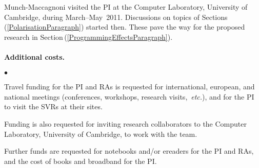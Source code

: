 \documentclass[11pt,twocolumn]{article}
\newenvironment{myitemize}
  {\begin{list}{$\bullet$}
  {\setlength{\topsep}{2pt}
   \setlength{\partopsep}{2pt}
   \setlength{\itemsep}{2.5pt}
   \setlength{\parsep}{2.5pt}
   \setlength{\leftmargin}{1em}
   \setlength{\labelwidth}{.5em}}}
  {\end{list}}
\newcommand{\hidefootnote}[2]{}
\newcommand{\pref}[1]{\,(\ref{#1})}
\newcommand{\Eg}{\emph{Eg.}}
\newcommand{\etc}{\emph{etc.}}
\begin{document}
Munch-Maccagnoni visited the PI at the Computer Laboratory, University of
Cambridge, during March--May~2011.  Discussions on topics of
Sections\pref{PolarisationParagraph} started then.  These pave the way for the
proposed research in Section\pref{ProgrammingEffectsParagraph}.



\paragraph*{Additional costs.}

\begin{myitemize}
\item
Travel funding for the PI and RAs is requested for international, european,
and national meetings (conferences, workshops, research
visits,~\etc),\hidefootnote{\Eg~CALCO, CIE, CSL, CT, ICALP, ICFP, LICS, MFPS,
  POPL, PPDP, PSSL, RTA, TLCA, TYPES, WOLLIC.}{} 
and for the PI to visit the SVRs at their sites. \hidefootnote{\Eg~Aarhus
  (A\,Kock); 
  Bamberg (Mendler);
  Barcelona (J\,Kock);
  Bath (Power); 
  Berkeley (D\,Scott); 
  Birmingham (Escard\'o, Levy); 
  Bologna (Asperti, Dal Lago);
  Buffalo (Lawvere);
  Copenhagen (Birkedal, Filinski); 
  Darmstadt (Streicher); 
  Dublin (Dotsenko);
  Edinburgh (Leinster, Plotkin, A\,Simpson); 
  Genova (Moggi, Rosolini); 
  G\"oteborg (Coquand, Dybjer);
  Gunma (Hamana);
  Ljubljana (Bauer, Pretnar);
  London (Oliva);
  Manchester (Aczel);
  Marseille (Girard, Lafont, Regnier); 
  Montreal (Joyal, Makkai, Panangaden);
  Munich (Abel, Hofmann);
  Nice (C\,Simpson, Vallette);
  Nijmegen (Moerdijk);
  Nottingham (Altenkirch);
  Ottawa (P\,Scott); 
  Oxford (Abramsky, Coecke, Doring); 
  Paris (Burroni, Curien, Herbelin, Krivine, Melli\`es, Metayer);
  Philadelphia (Freyd, Pierce, Weirich);
  Pittsburgh (Avigad, Awodey, Harper, Pfenning, Reynolds);
  Portland (Sheard);
  Princeton (Warren);
  Strathclyde (Ghani, McBride);
  Swansea (Beckmann, Berger);
  Sydney (Garner, Lack, Street);
  Warsaw (Klin, Zawadowski).}.
\item
Funding is also requested for inviting research collaborators to the Computer
Laboratory, University of Cambridge, to work with the team.

\item
Further funds are requested for notebooks and/or ereaders for the PI and RAs,
and the cost of books and broadband for the PI.
\end{myitemize}
\end{document}
